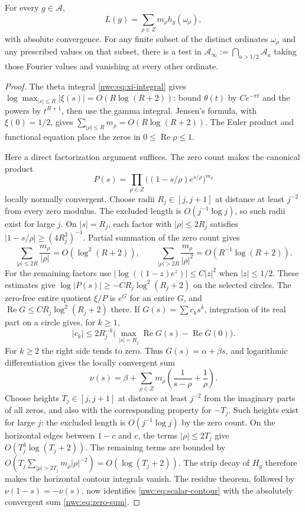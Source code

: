 \begin{lemma}\label{nwc:lem:full-scalar}
For every $g\in\mathcal A$,
\begin{equation}\label{nwc:eq:zero-sum}
 L(g)=\sum_{\rho\in Z}m_\rho h_g(\omega_\rho),
\end{equation}
with absolute convergence.
For any finite subset of the distinct ordinates $\omega_\rho$ and
any prescribed values on that subset, there is a test in
$\mathcal A_\infty:=\bigcap_{a>1/2}\mathcal A_a$ taking those
Fourier values and vanishing at every other ordinate.
\end{lemma}
\begin{proof}
The theta integral \eqref{nwc:eq:xi-integral} gives
$\log\max_{|s|\leq R}|\xi(s)|=O(R\log(R+2))$:
bound $\theta(t)$ by $Ce^{-\pi t}$ and the powers by $t^{R+1}$,
then use the gamma integral. Jensen's formula, with $\xi(0)=1/2$,
gives $\sum_{|\rho|\leq R}m_\rho=O(R\log(R+2))$.
The Euler product and functional equation place the zeros in
$0\leq\operatorname{Re}\rho\leq1$.

Here a direct factorization argument suffices. The zero count makes
the canonical product
\[
 P(s)=\prod_{\rho\in Z}\bigl((1-s/\rho)e^{s/\rho}\bigr)^{m_\rho}
\]
locally normally convergent. Choose radii $R_j\in[j,j+1]$ at
distance at least $j^{-2}$ from every zero modulus.
The excluded length is $O(j^{-1}\log j)$, so such radii exist for
large $j$. On $|s|=R_j$, each factor with $|\rho|\leq2R_j$
satisfies $|1-s/\rho|\geq(4R_j^3)^{-1}$.
Partial summation of the zero count gives
\[
 \sum_{|\rho|\leq2R}\frac{m_\rho}{|\rho|}=O(\log^2(R+2)),\qquad
 \sum_{|\rho|>2R}\frac{m_\rho}{|\rho|^2}=O(R^{-1}\log(R+2)).
\]
For the remaining factors use
$|\log((1-z)e^z)|\leq C|z|^2$ when $|z|\leq1/2$.
These estimates give $\log|P(s)|\geq-CR_j\log^2(R_j+2)$
on the selected circles.
The zero-free entire quotient $\xi/P$ is $e^G$ for an entire $G$,
and $\operatorname{Re}G\leq CR_j\log^2(R_j+2)$ there.
If $G(s)=\sum c_ks^k$, integration of its real part on a circle
gives, for $k\geq1$,
\[
 |c_k|\leq 2R_j^{-k}
       \bigl(\max_{|s|=R_j}\operatorname{Re}G(s)
                         -\operatorname{Re}G(0)\bigr).
\]
For $k\geq2$ the right side tends to zero. Thus $G(s)=\alpha+\beta s$,
and logarithmic differentiation gives the locally convergent sum
\[
 \nu(s)=\beta+\sum_{\rho\in Z}m_\rho
             \left(\frac1{s-\rho}+\frac1\rho\right).
\]
Choose heights $T_j\in[j,j+1]$ at distance at least $j^{-2}$
from the imaginary parts of all zeros, and also with the corresponding
property for $-T_j$. Such heights exist for large $j$: the excluded
length is $O(j^{-1}\log j)$ by the zero count.
On the horizontal edges between $1-c$ and $c$, the terms
$|\rho|\leq2T_j$ give $O(T_j^3\log(T_j+2))$.
The remaining terms are bounded by
$O(T_j\sum_{|\rho|>2T_j}m_\rho|\rho|^{-2})=O(\log(T_j+2))$.
The strip decay of $H_g$ therefore makes the horizontal contour
integrals vanish. The residue theorem, followed by
$\nu(1-s)=-\nu(s)$, now identifies
\eqref{nwc:eq:scalar-contour} with the absolutely convergent sum
\eqref{nwc:eq:zero-sum}.


\end{proof}

